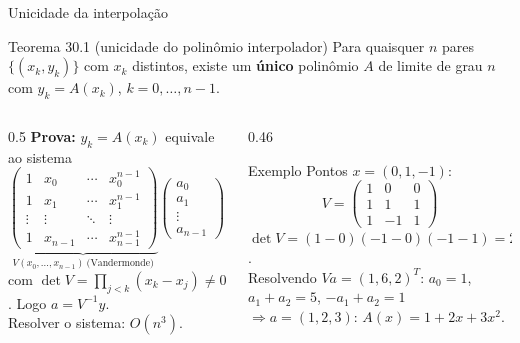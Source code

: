 \documentclass[aspectratio=169,10pt]{beamer}
\begin{document}
\begin{frame}{Unicidade da interpolação}
  \begin{block}{Teorema 30.1 (unicidade do polinômio interpolador)}
    Para quaisquer $n$ pares $\{(x_k,y_k)\}$ com $x_k$ distintos, existe um
    \textbf{único} polinômio $A$ de limite de grau $n$ com $y_k = A(x_k)$,
    $k = 0,\dots,n-1$.
  \end{block}
  \begin{columns}[T]
    \begin{column}{0.5\textwidth}
      \small
      \textbf{Prova:} $y_k = A(x_k)$ equivale ao sistema
      \[
        \underbrace{\begin{pmatrix}
          1 & x_0 & \cdots & x_0^{n-1}\\
          1 & x_1 & \cdots & x_1^{n-1}\\
          \vdots & \vdots & \ddots & \vdots\\
          1 & x_{n-1} & \cdots & x_{n-1}^{n-1}
        \end{pmatrix}}_{V(x_0,\dots,x_{n-1})\ \text{(Vandermonde)}}
        \begin{pmatrix} a_0\\ a_1\\ \vdots\\ a_{n-1}\end{pmatrix}
        =
        \begin{pmatrix} y_0\\ y_1\\ \vdots\\ y_{n-1}\end{pmatrix}
      \]
      com $\det V = \prod_{j<k}(x_k - x_j) \neq 0$. Logo $a = V^{-1}y$.\\[3pt]
      Resolver o sistema: $O(n^3)$.
    \end{column}
    \begin{column}{0.46\textwidth}
      \begin{exampleblock}{Exemplo}
        Pontos $x = (0, 1, -1)$:
        \[
          V = \begin{pmatrix} 1&0&0\\ 1&1&1\\ 1&-1&1 \end{pmatrix}
        \]
        $\det V = (1-0)(-1-0)(-1-1) = 2 \neq 0$.\\
        Resolvendo $Va = (1,6,2)^T$:
        $a_0 = 1$, $a_1+a_2 = 5$, $-a_1+a_2 = 1$\\
        $\Rightarrow a = (1, 2, 3)$: $A(x) = 1 + 2x + 3x^2$.
      \end{exampleblock}
    \end{column}
  \end{columns}
\end{frame}
\end{document}
